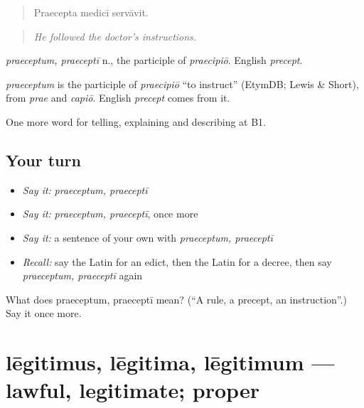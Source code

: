 \begin{quote}
Praecepta medicī servāvit.
\end{quote}

\begin{quote}
\emph{He followed the doctor's instructions.}
\end{quote}

\emph{praeceptum, praeceptī} n., the participle of \emph{praecipiō}. English \emph{precept}.

\begin{cousinweb}
\emph{praeceptum} is the participle of \emph{praecipiō} \textquotedblleft{}to instruct\textquotedblright{} (EtymDB; Lewis \& Short), from \emph{prae} and \emph{capiō}. English \emph{precept} comes from it.
\end{cousinweb}

\begin{grammarlens}[title={What you've built}]
One more word for telling, explaining and describing at B1.
\end{grammarlens}

\subsection*{Your turn}
\begin{itemize}
\raggedright
  \item \emph{Say it:} \emph{praeceptum, praeceptī}
  \item \emph{Say it:} \emph{praeceptum, praeceptī}, once more
  \item \emph{Say it:} a sentence of your own with \emph{praeceptum, praeceptī}
  \item \emph{Recall:} say the Latin for an edict, then the Latin for a decree, then say \emph{praeceptum, praeceptī} again
\end{itemize}

\begin{tcolorbox}[breakable,colback=teal!4,colframe=teal!35!black,title={Before you move on}]
What does praeceptum, praeceptī mean? (\textquotedblleft{}A rule, a precept, an instruction\textquotedblright{}.) Say it once more.
\end{tcolorbox}
\section[lēgitimus, lēgitima, lēgitimum]{lēgitimus, lēgitima, lēgitimum — lawful, legitimate; proper}

\label{lesson:LA-C409-legitimus}



